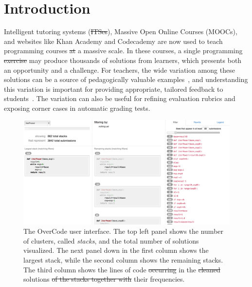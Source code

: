 \documentclass[12pt,twoside]{mitthesis}
\providecommand{\DIFaddtex}[1]{{\protect\color{blue}\uwave{#1}}} %
\providecommand{\DIFdeltex}[1]{{\protect\color{red}\sout{#1}}}                      %
\providecommand{\DIFaddbegin}{} %
\providecommand{\DIFaddend}{} %
\providecommand{\DIFdelbegin}{} %
\providecommand{\DIFdelend}{} %
\providecommand{\DIFaddFL}[1]{\DIFadd{#1}} %
\providecommand{\DIFdelFL}[1]{\DIFdel{#1}} %
\providecommand{\DIFaddbeginFL}{} %
\providecommand{\DIFaddendFL}{} %
\providecommand{\DIFdelbeginFL}{} %
\providecommand{\DIFdelendFL}{} %
\providecommand{\DIFadd}[1]{\texorpdfstring{\DIFaddtex{#1}}{#1}} %
\providecommand{\DIFdel}[1]{\texorpdfstring{\DIFdeltex{#1}}{}} %
\begin{document}
\section{Introduction}

Intelligent tutoring systems (\DIFdelbegin \DIFdel{ITSes}\DIFdelend \DIFaddbegin \DIFadd{ITS}\DIFaddend ), Massive Open Online Courses (MOOCs), and websites like Khan Academy and Codecademy are now used to teach programming courses \DIFdelbegin \DIFdel{at }\DIFdelend \DIFaddbegin \DIFadd{on }\DIFaddend a massive scale. In these courses, a single programming \DIFdelbegin \DIFdel{exercise }\DIFdelend \DIFaddbegin \DIFadd{problem }\DIFaddend may produce thousands of solutions from learners, which presents both an opportunity and a challenge. For teachers, the wide variation among these solutions can be a source of pedagogically valuable examples~\cite{marton13}, and understanding this variation is important for providing appropriate, tailored feedback to students~\cite{basupowergrading,MOOCshop}. The variation can also be useful for refining evaluation rubrics and exposing corner cases in automatic grading tests.

\begin{figure}[t!]
\centering
\includegraphics[width=1.0\linewidth]{Body/figures/overcode/interfaceScreenShot.png}
\caption{The OverCode user interface. The top left panel shows the number of clusters, called {\it stacks}, and the total number of solutions visualized. The next panel down in the first column shows the largest stack, while the second column shows the remaining stacks. The third column shows the lines of code \DIFdelbeginFL \DIFdelFL{occurring }\DIFdelendFL in the \DIFdelbeginFL \DIFdelFL{cleaned }\DIFdelendFL \DIFaddbeginFL \DIFaddFL{platonic }\DIFaddendFL solutions \DIFdelbeginFL \DIFdelFL{of the stacks together with }\DIFdelendFL \DIFaddbeginFL \DIFaddFL{and }\DIFaddendFL their frequencies.}
\label{overcode_fullinterface}
\end{figure}
\end{document}
